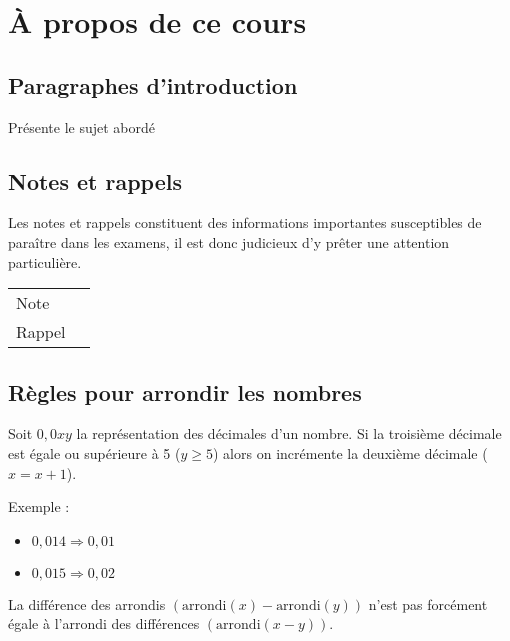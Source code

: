 \chapter*{À propos de ce cours}



\section*{Paragraphes d'introduction}
\begin{intro}
	Présente le sujet abordé 
\end{intro}



\section*{Notes et rappels}
\begin{note}
	Les notes et rappels constituent des informations importantes susceptibles de paraître dans les examens, il est donc judicieux d'y prêter une attention particulière.
	\begin{center}
		\begin{tabular}{l@{\qquad}l}
			Note   & \Large\righthand \\
			Rappel & \Large\aldine
		\end{tabular}
	\end{center}
\end{note}



\section*{Règles pour arrondir les nombres}
Soit $0,0xy$ la représentation des décimales d'un nombre. Si la troisième décimale est égale ou supérieure à 5 ($y \geq 5$) alors on incrémente la deuxième décimale ($x = x + 1$).

Exemple :
\begin{itemize}
	\item $0,014 \Rightarrow 0,01$
	\item $0,015 \Rightarrow 0,02$
\end{itemize}

\marginpar{\color{BrickRed}\Large{\danger}}
La différence des arrondis \( (\text{arrondi}(x)-\text{arrondi}(y)) \) n’est pas forcément égale à l’arrondi des différences \( (\text{arrondi}(x-y) ) \).

